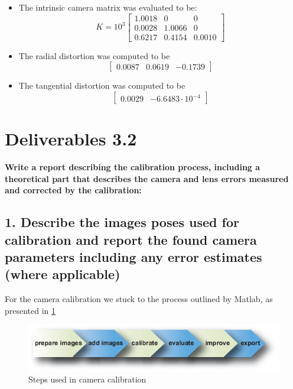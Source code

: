 \begin{itemize}
	
\item The intrinsic camera matrix was evaluated to be:
\begin{equation}
K = 10^3\begin{bmatrix}
1.0018 & 0 & 0 \\
0.0028 & 1.0066 & 0 \\
0.6217 & 0.4154 & 0.0010
\end{bmatrix}
\end{equation}
\item The radial distortion was computed to be 
\begin{equation}
\begin{bmatrix}
0.0087 & 0.0619 & -0.1739
\end{bmatrix}
\end{equation}
\item The tangential distortion was computed to be 
\begin{equation}
\begin{bmatrix}
0.0029 & -6.6483 \cdot 10^{-4}
\end{bmatrix}
\end{equation}
\end{itemize}

\section{Deliverables 3.2}
\textbf{Write a report describing the calibration process, including a theoretical part that describes the camera and lens errors measured and corrected by the calibration:}
\subsection*{1. Describe the images poses used for calibration and report the found camera parameters including any error estimates (where applicable)}
For the camera calibration we stuck to the process outlined by Matlab, as presented in \ref{fig:cameracalibratorappsteps}

\begin{figure}[ht!]
	\centering
	\includegraphics[width=0.7\linewidth]{graphics/cameracalibrator_app_steps}
	\caption{Steps used in camera calibration}
	\label{fig:cameracalibratorappsteps}
\end{figure}

